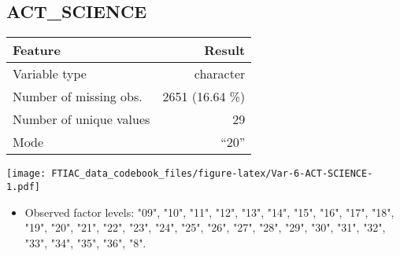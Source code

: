 \documentclass[]{article}
\providecommand{\tightlist}{%
  \setlength{\itemsep}{0pt}\setlength{\parskip}{0pt}}
\newcommand{\fullline}{\noindent\makebox[\linewidth]{\rule{\textwidth}{0.4pt}}}
\newcommand{\bminione}{\begin{minipage}{0.75 \textwidth}}
\newcommand{\bminitwo}{\begin{minipage}{0.25 \textwidth}}
\newcommand{\emini}{\end{minipage}}
\begin{document}
\fullline

\hypertarget{act_science}{\subsection{ACT\_SCIENCE}\label{act_science}}

\bminione

\begin{longtable}[]{@{}lr@{}}
\toprule
\begin{minipage}[b]{0.34\columnwidth}\raggedright\strut
Feature\strut
\end{minipage} & \begin{minipage}[b]{0.21\columnwidth}\raggedleft\strut
Result\strut
\end{minipage}\tabularnewline
\midrule
\endhead
\begin{minipage}[t]{0.34\columnwidth}\raggedright\strut
Variable type\strut
\end{minipage} & \begin{minipage}[t]{0.21\columnwidth}\raggedleft\strut
character\strut
\end{minipage}\tabularnewline
\begin{minipage}[t]{0.34\columnwidth}\raggedright\strut
Number of missing obs.\strut
\end{minipage} & \begin{minipage}[t]{0.21\columnwidth}\raggedleft\strut
2651 (16.64 \%)\strut
\end{minipage}\tabularnewline
\begin{minipage}[t]{0.34\columnwidth}\raggedright\strut
Number of unique values\strut
\end{minipage} & \begin{minipage}[t]{0.21\columnwidth}\raggedleft\strut
29\strut
\end{minipage}\tabularnewline
\begin{minipage}[t]{0.34\columnwidth}\raggedright\strut
Mode\strut
\end{minipage} & \begin{minipage}[t]{0.21\columnwidth}\raggedleft\strut
``20''\strut
\end{minipage}\tabularnewline
\bottomrule
\end{longtable}

\emini
\bminitwo
\texttt{[image: FTIAC\_data\_codebook\_files/figure-latex/Var-6-ACT-SCIENCE-1.pdf]}
\emini

\begin{itemize}
\tightlist
\item
  Observed factor levels: "09", "10", "11", "12", "13", "14", "15",
  "16", "17", "18", "19", "20", "21", "22", "23", "24", "25", "26",
  "27", "28", "29", "30", "31", "32", "33", "34", "35", "36", "8".
\end{itemize}
\end{document}
